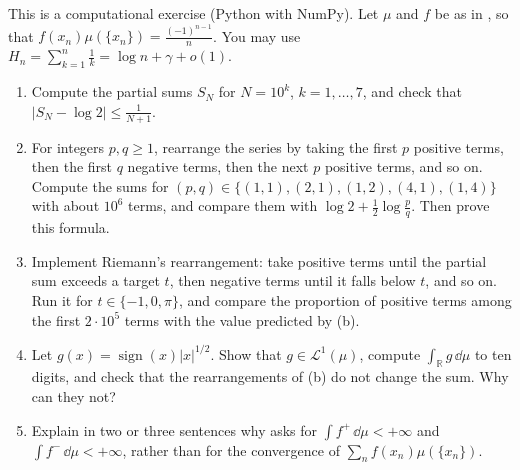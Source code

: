 \begin{exercise}\label{ex:ig-rearrangement}
\hard This is a computational exercise (Python with NumPy). Let $\mu$ and $f$ be as in
, so that $f(x_n)\mu(\{x_n\})=\frac{(-1)^{n-1}}n$. You may use
$H_n=\sum_{k=1}^n\frac1k=\log n+\gamma+o(1)$.
\begin{enumerate}[label=(\alph*)]
  \item Compute the partial sums $S_N$ for $N=10^k$, $k=1,\dots,7$, and check that
    $|S_N-\log2|\le\frac1{N+1}$.
  \item For integers $p,q\ge1$, rearrange the series by taking the first $p$ positive terms, then
    the first $q$ negative terms, then the next $p$ positive terms, and so on. Compute the sums for
    $(p,q)\in\{(1,1),(2,1),(1,2),(4,1),(1,4)\}$ with about $10^6$ terms, and compare them with
    $\log2+\frac12\log\frac pq$. Then prove this formula.
  \item Implement Riemann's rearrangement: take positive terms until the partial sum exceeds a
    target $t$, then negative terms until it falls below $t$, and so on. Run it for
    $t\in\{-1,0,\pi\}$, and compare the proportion of positive terms among the first $2\cdot10^5$
    terms with the value predicted by (b).
  \item Let $g(x)=\operatorname{sign}(x)|x|^{1/2}$. Show that $g\in\mathcal L^1(\mu)$, compute
    $\int_{\mathbb R}g\,\dd\mu$ to ten digits, and check that the rearrangements of (b) do not
    change the sum. Why can they not?
  \item Explain in two or three sentences why  asks for
    $\int f^+\,\dd\mu<+\infty$ and $\int f^-\,\dd\mu<+\infty$, rather than for the convergence of
    $\sum_nf(x_n)\mu(\{x_n\})$.
\end{enumerate}
\end{exercise}

